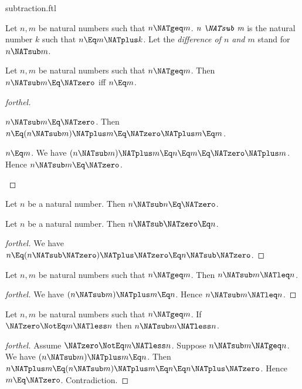 \documentclass{stex}
\begin{document}
\begin{smodule}{subtraction.ftl}

\begin{definition}[forthel]
  Let $n, m$ be natural numbers such that $n \NATgeq m$.
  $\emph{n \NATsub m}$ is the natural number $k$ such that $n \Eq m \NATplus k$.
  Let the \emph{difference of $n$ and $m$} stand for $n \NATsub m$.
\end{definition}

\begin{proposition}[forthel]
  Let $n, m$ be natural numbers such that $n \NATgeq m$.
  Then $n \NATsub m \Eq \NATzero$ iff $n \Eq m$.
\end{proposition}
\begin{proof}[forthel]
  \begin{case}{$n \NATsub m \Eq \NATzero$.}
    Then $n
      \Eq (n \NATsub m) \NATplus m
      \Eq \NATzero \NATplus m
      \Eq m$.
  \end{case}

  \begin{case}{$n \Eq m$.}
    We have $(n \NATsub m) \NATplus m
      \Eq n
      \Eq m
      \Eq \NATzero \NATplus m$.
    Hence $n \NATsub m \Eq \NATzero$.
  \end{case}
\end{proof}

\begin{corollary}[forthel]
  Let $n$ be a natural number.
  Then $n \NATsub n \Eq \NATzero$.
\end{corollary}

\begin{proposition}[forthel]
  Let $n$ be a natural number.
  Then $n \NATsub \NATzero \Eq n$.
\end{proposition}
\begin{proof}[forthel]
  We have $n
    \Eq (n \NATsub \NATzero) \NATplus \NATzero
    \Eq n \NATsub \NATzero$.
\end{proof}

\begin{proposition}[forthel]
  Let $n, m$ be natural numbers such that $n \NATgeq m$.
  Then $n \NATsub m \NATleq n$.
\end{proposition}
\begin{proof}[forthel]
  We have $(n \NATsub m) \NATplus m \Eq n$.
  Hence $n \NATsub m \NATleq n$.
\end{proof}

\begin{proposition}[forthel]
  Let $n, m$ be natural numbers such that $n \NATgeq m$.
  If $\NATzero \NotEq m \NATless n$ then $n \NATsub m \NATless n$.
\end{proposition}
\begin{proof}[forthel]
  Assume $\NATzero \NotEq m \NATless n$.
  Suppose $n \NATsub m \NATgeq n$.
  We have $(n \NATsub m) \NATplus m \Eq n$.
  Then $n \NATplus m
    \Eq (n \NATsub m) \NATplus m
    \Eq n
    \Eq n \NATplus \NATzero$.
  Hence $m \Eq \NATzero$.
  Contradiction.
\end{proof}


\end{smodule}
\end{document}
